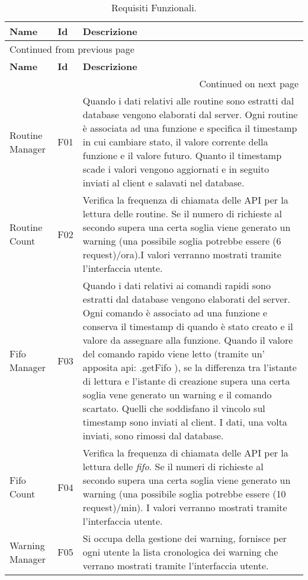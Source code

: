 \documentclass[onecolumn,a4paper]{article}
\begin{document}
\begin{longtable}{|l|l|p{8.5cm}|}
\caption{Requisiti Funzionali.}
\\
\hline
\textbf{Name} & \textbf{Id} & \textbf{Descrizione}\\
\hline
\endfirsthead
\multicolumn{3}{l}{Continued from previous page} \\
\hline

\textbf{Name} & \textbf{Id} & \textbf{Descrizione} \\

\hline
\endhead
\hline\multicolumn{3}{r}{Continued on next page} \\
\endfoot
\endlastfoot
\hline
Routine Manager & F01 & Quando i dati relativi alle routine sono estratti dal database vengono elaborati dal server. Ogni routine è associata ad una funzione e specifica il timestamp in cui cambiare stato, il valore corrente della funzione e il valore futuro. Quanto il timestamp scade i valori vengono aggiornati e in seguito inviati al client e salavati nel database.\\
\hline
Routine Count & F02 & Verifica la frequenza di chiamata delle API per la lettura delle routine. Se il numero di richieste al secondo supera una certa soglia viene generato un warning (una possibile soglia potrebbe essere (6 request)/ora).I valori verranno mostrati tramite l'interfaccia utente.\\
\hline
Fifo Manager & F03 & Quando i dati relativi ai comandi rapidi sono estratti dal database vengono elaborati del server. Ogni comando è associato ad una funzione e conserva il timestamp di quando è stato creato e il valore da assegnare alla funzione. Quando il valore del comando rapido viene letto (tramite un' apposita api: .getFifo ), se la differenza tra l'istante di lettura e l'istante di creazione supera una certa soglia vene generato un warning e il comando scartato. Quelli che soddisfano il vincolo sul timestamp sono inviati al client. I dati, una volta inviati, sono rimossi dal database.\\
\hline
Fifo Count & F04 & Verifica la frequenza di chiamata delle API per la lettura delle \emph{fifo}. Se il numeri di richieste al secondo supera una certa soglia viene generato un warning (una possibile soglia potrebbe essere (10 request)/min). I valori verranno mostrati tramite l'interfaccia utente.\\
\hline
Warning Manager & F05 & Si occupa della gestione dei warning, fornisce per ogni utente la lista cronologica dei warning che verrano mostrati tramite l'interfaccia utente.\\

\end{longtable}
\end{document}
